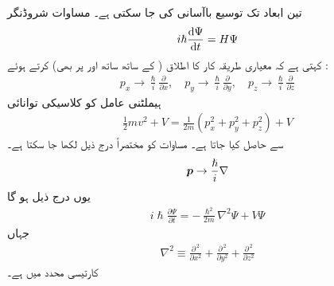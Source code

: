 




تین ابعاد تک توسیع  باآسانی کی جا سکتی ہے۔ مساوات شروڈنگر
\begin{align}
i\hslash\frac{\dif{\Psi}}{\dif{t}}=H\Psi
\end{align}
 کہتی ہے کہ  معیاری طریقہ کار  کا اطلاق  (  کے ساتھ ساتھ  اور  پر بھی) کرتے ہوئے :
\begin{align}\label{مساوات_تین_ابعاد_عاملین_الف}
 p_{x}\to \frac{\hslash}{i}\frac{\partial}{\partial{x}},\quad p_{y}\to \frac{\hslash}{i}\frac{\partial}{\partial{y}},\quad p_{z}\to \frac{\hslash}{i}\frac{\partial}{\partial{z}} 
\end{align}
ہیملٹنی عامل  کو کلاسیکی توانائی
\begin{align*}
\frac{1}{2}mv^{2}+V=\frac{1}{2m}(p_{x}^{2}+p_{y}^{2}+p_{z}^{2})+V
\end{align*}
سے حاصل کیا جاتا ہے۔ مساوات  کو مختصراً درج ذیل لکھا  جا سکتا ہے۔
\begin{align}
{\ensuremath{{\boldsymbol{p}}}}\to \frac{\hslash}{i}\nabla
\end{align}
یوں درج ذیل ہو گا
\begin{align}
i\hslash\frac{\partial{\Psi}}{\partial{t}}=-\frac{\hslash^{2}}{2m}\nabla^{2}\Psi+V\Psi
\end{align}
جہاں
\begin{align}
\nabla^{2}\equiv \frac{\partial^{\,2}}{\partial{x^2}}+\frac{\partial^{\,2}}{\partial{y^2}}+\frac{\partial^{\,2}}{\partial{z^2}} 
\end{align}
کارتیسی محدد میں  ہے۔


